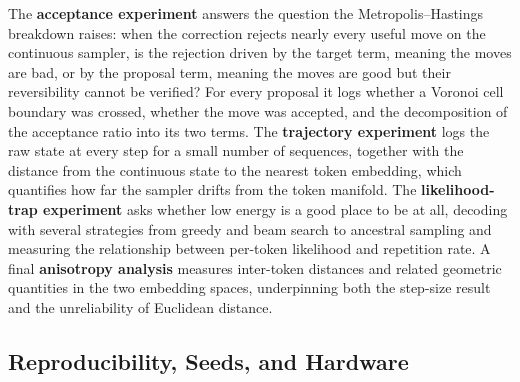The \textbf{acceptance experiment} answers the question the Metropolis--Hastings breakdown raises: when the correction rejects nearly every useful move on the continuous sampler, is the rejection driven by the target term, meaning the moves are bad, or by the proposal term, meaning the moves are good but their reversibility cannot be verified? For every proposal it logs whether a Voronoi cell boundary was crossed, whether the move was accepted, and the decomposition of the acceptance ratio into its two terms. The \textbf{trajectory experiment} logs the raw state at every step for a small number of sequences, together with the distance from the continuous state to the nearest token embedding, which quantifies how far the sampler drifts from the token manifold. The \textbf{likelihood-trap experiment} asks whether low energy is a good place to be at all, decoding with several strategies from greedy and beam search to ancestral sampling and measuring the relationship between per-token likelihood and repetition rate. A final \textbf{anisotropy analysis} measures inter-token distances and related geometric quantities in the two embedding spaces, underpinning both the step-size result and the unreliability of Euclidean distance.


\subsection{Reproducibility, Seeds, and Hardware}
\label{sec:meth-repro}

